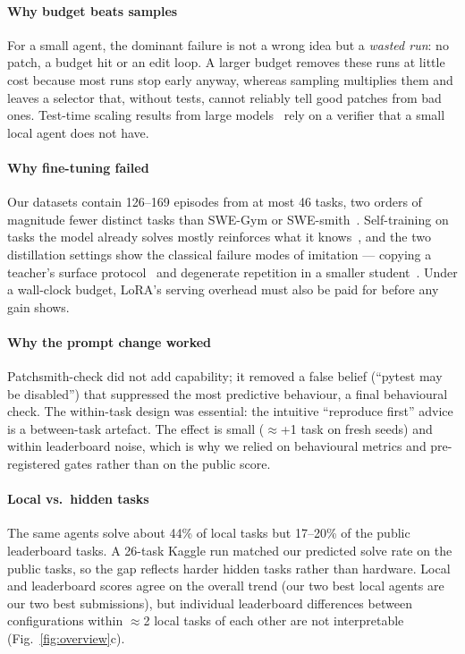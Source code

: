\documentclass[conference]{IEEEtran}
\begin{document}
\paragraph*{Why budget beats samples} For a small agent, the dominant failure is not a wrong idea but a \emph{wasted run}: no patch, a budget hit or an edit loop. A larger budget removes these runs at little cost because most runs stop early anyway, whereas sampling multiplies them and leaves a selector that, without tests, cannot reliably tell good patches from bad ones. Test-time scaling results from large models~\cite{brown2024monkeys,ehrlich2025codemonkeys} rely on a verifier that a small local agent does not have.

\paragraph*{Why fine-tuning failed} Our datasets contain 126--169 episodes from at most 46 tasks, two orders of magnitude fewer distinct tasks than SWE-Gym or SWE-smith~\cite{pan2025swegym,yang2025swesmith}. Self-training on tasks the model already solves mostly reinforces what it knows~\cite{zelikman2022star}, and the two distillation settings show the classical failure modes of imitation --- copying a teacher's surface protocol~\cite{gudibande2023false} and degenerate repetition in a smaller student~\cite{holtzman2020degeneration}. Under a wall-clock budget, LoRA's serving overhead must also be paid for before any gain shows.

\paragraph*{Why the prompt change worked} Patchsmith-check did not add capability; it removed a false belief (``pytest may be disabled'') that suppressed the most predictive behaviour, a final behavioural check. The within-task design was essential: the intuitive ``reproduce first'' advice is a between-task artefact. The effect is small ($\approx$+1 task on fresh seeds) and within leaderboard noise, which is why we relied on behavioural metrics and pre-registered gates rather than on the public score.

\paragraph*{Local vs.\ hidden tasks} The same agents solve about 44\% of local tasks but 17--20\% of the public leaderboard tasks. A 26-task Kaggle run matched our predicted solve rate on the public tasks, so the gap reflects harder hidden tasks rather than hardware. Local and leaderboard scores agree on the overall trend (our two best local agents are our two best submissions), but individual leaderboard differences between configurations within $\approx$2 local tasks of each other are not interpretable (Fig.~\ref{fig:overview}c).
\end{document}
